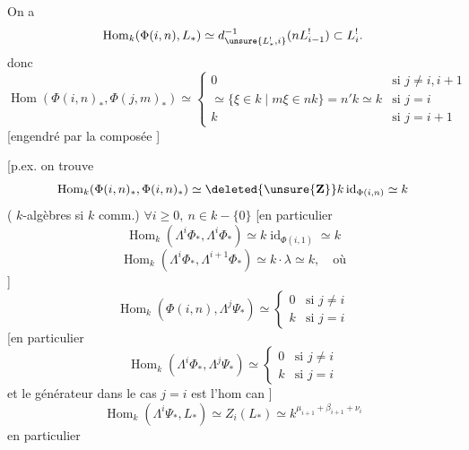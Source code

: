On a
\[
\operatorname{Hom}_k(\Phi(i,n),L_*)
\simeq d^{-1}_{\unsure{L^!_*,i}}(nL^!_{i-1})\subset L^!_i.
\]
donc
\[
\operatorname{Hom}(\Phi(i,n)_*,\Phi(j,m)_*)\simeq
\left\{\begin{array}{ll}
0&\text{si }j\neq i,i+1\\
\simeq\{\xi\in k\mid m\xi\in nk\}=n'k\simeq k&
\text{si }j=i\\
k&\text{si }j=i+1
\end{array}\right.
\]
[engendré par la composée
]

[p.ex. on trouve
\[
\operatorname{Hom}_k(\Phi(i,n)_*,\Phi(i,n)_*)
\simeq\deleted{\unsure{\mathbf Z}}k\operatorname{id}_{\Phi(i,n)}\simeq k
\]
(  
$k$-algèbres si $k$ comm.)
$\forall i\geq0,\ n\in k-\{0\}$
[en particulier
\[
\operatorname{Hom}_k(\Lambda^i\Phi_*,\Lambda^i\Phi_*)
\simeq k\operatorname{id}_{\Phi(i,1)}\simeq k
\]
\[
\operatorname{Hom}_k(\Lambda^i\Phi_*,\Lambda^{i+1}\Phi_*)
\simeq k\cdot\lambda\simeq k,\quad\text{où}
\]
]
\[
\operatorname{Hom}_k(\Phi(i,n),\Lambda^j\Psi_*)\simeq
\left\{\begin{array}{ll}0&\text{si }j\neq i\\k&\text{si }j=i\end{array}\right.
\]
[en particulier
\[
\operatorname{Hom}_k(\Lambda^i\Phi_*,\Lambda^j\Psi_*)\simeq
\left\{\begin{array}{ll}0&\text{si }j\neq i\\k&\text{si }j=i\end{array}\right.
\]
et le générateur dans le cas $j=i$ est
l'hom can
]
\[
\operatorname{Hom}_k(\Lambda^i\Psi_*,L_*)
\simeq Z_i(L_*)\simeq k^{\mu_{i+1}+\beta_{i+1}+\nu_i}
\]
en particulier
